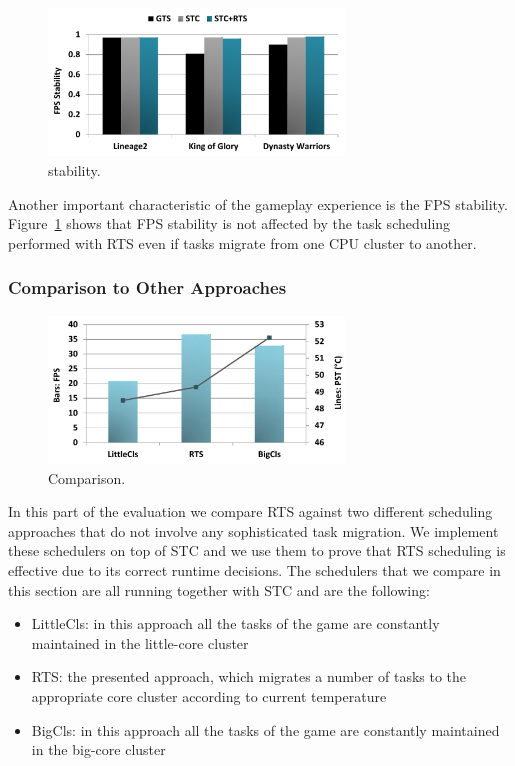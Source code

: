 \begin{figure}[t]%
	\centering
	\includegraphics[width=0.7\textwidth]{figures/stability.pdf}
	\caption{stability.}
	\label{fig:stability}
\end{figure}

Another important characteristic of the gameplay experience is the FPS stability.
Figure~\ref{fig:stability} shows that FPS stability is not affected by the task scheduling performed with RTS even if tasks migrate from one CPU cluster to another.

\subsubsection{Comparison to Other Approaches}
\begin{figure}[t]%
	\centering
	\includegraphics[width=0.7\textwidth]{figures/intern_comparison.pdf}
	\caption{Comparison.}
	\label{fig:int_comparison}
\end{figure}
In this part of the evaluation we compare RTS against two different scheduling approaches that do not involve any sophisticated task migration.
We implement these schedulers on top of STC and we use them to prove that RTS scheduling is effective due to its correct runtime decisions.
The schedulers that we compare in this section are all running together with STC and are the following:
\begin{itemize}
	\item LittleCls: in this approach all the tasks of the game are constantly maintained in the little-core cluster
	\item RTS: the presented approach, which migrates a number of tasks to the appropriate core cluster according to current temperature
	\item BigCls: in this approach all the tasks of the game are constantly maintained in the big-core cluster
\end{itemize} 

